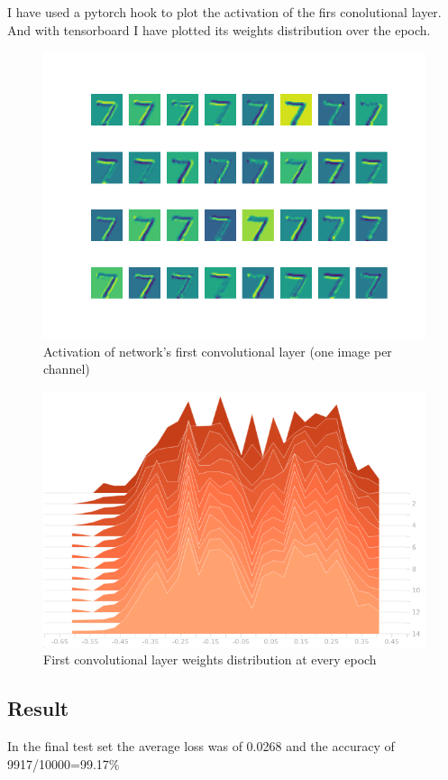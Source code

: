 \documentclass{article}
\begin{document}
I have used a pytorch hook to plot the activation of the firs conolutional layer. And with tensorboard I have plotted its weights distribution over the epoch.
\begin{figure}[H]
    \includegraphics[width=\linewidth]{mnist_task/imgs/conv1.png}
    \caption{Activation of network's first convolutional layer (one image per channel)}\label{conv1}
\end{figure}
\begin{figure}[H]
    \includegraphics[width=\linewidth]{mnist_task/imgs/conv1_weight_dist.png}
    \caption{First convolutional layer weights distribution at every epoch}\label{conv1}
\end{figure}


\subsection{Result}
In the final test set the average loss was of 0.0268 and the accuracy of 9917/10000=99.17\%
\end{document}
